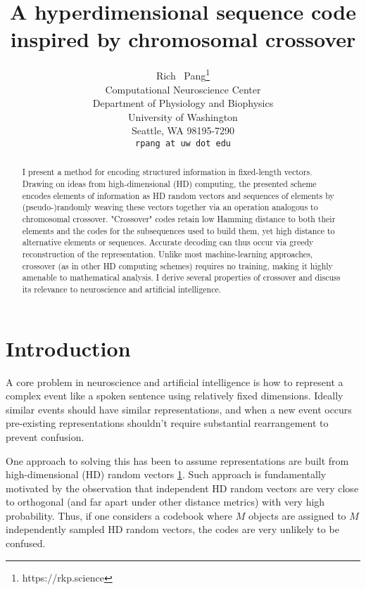 \documentclass{article}
\title{A hyperdimensional sequence code inspired by chromosomal crossover}
\author{
  Rich ~Pang\thanks{https://rkp.science} \\
  Computational Neuroscience Center\\
  Department of Physiology and Biophysics\\
  University of Washington\\
  Seattle, WA 98195-7290 \\
  \texttt{rpang at uw dot edu} \\
}
\begin{document}
\maketitle

\begin{abstract}
I present a method for encoding structured information in fixed-length vectors. Drawing on ideas from high-dimensional (HD) computing, the presented scheme encodes elements of information as HD random vectors and sequences of elements by (pseudo-)randomly weaving these vectors together via an operation analogous to chromosomal crossover. "Crossover" codes retain low Hamming distance to both their elements and the codes for the subsequences used to build them, yet high distance to alternative elements or sequences. Accurate decoding can thus occur via greedy reconstruction of the representation. Unlike most machine-learning approaches, crossover (as in other HD computing schemes) requires no training, making it highly amenable to mathematical analysis. I derive several properties of crossover and discuss its relevance to neuroscience and artificial intelligence.
\end{abstract}




\section{Introduction}
A core problem in neuroscience and artificial intelligence is how to represent a complex event like a spoken sentence using relatively fixed dimensions. Ideally similar events should have similar representations, and when a new event occurs pre-existing representations shouldn't require substantial rearrangement to prevent confusion.

One approach to solving this has been to assume representations are built from high-dimensional (HD) random vectors \ref{}. Such approach is fundamentally motivated by the observation that independent HD random vectors are very close to orthogonal (and far apart under other distance metrics) with very high probability. Thus, if one considers a codebook where $M$ objects are assigned to $M$ independently sampled HD random vectors, the codes are very unlikely to be confused. 
\end{document}
